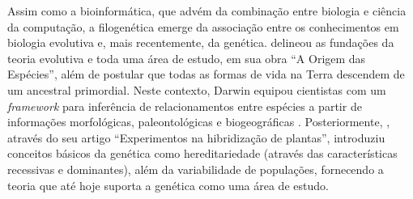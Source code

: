 \documentclass[english,brazilian]{UNISINOSmonografia} %
\begin{document}
%
%


Assim como a bioinformática, que advém da combinação entre biologia e ciência da computação, a filogenética emerge da associação entre os conhecimentos em biologia evolutiva e, mais recentemente, da genética.
 delineou as fundações da teoria evolutiva e toda uma área de estudo, em sua obra ``A Origem das Espécies'', além de postular que todas as formas de vida na Terra descendem de um ancestral primordial.
Neste contexto, Darwin equipou cientistas com um \textit{framework} para inferência de relacionamentos entre espécies a partir de informações morfológicas, paleontológicas e biogeográficas \cite{Keane2006a}.
Posteriormente, , através do seu artigo ``Experimentos na hibridização de plantas'', introduziu conceitos básicos da genética como hereditariedade (através das características recessivas e dominantes), além da variabilidade de populações, fornecendo a teoria que até hoje suporta a genética como uma área de estudo.




\end{document}
